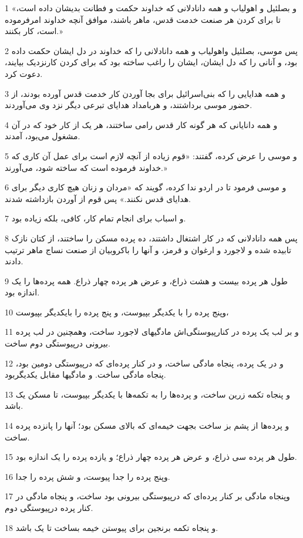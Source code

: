 \par 1 «و بصلئیل و اهولیاب و همه دانادلانی که خداوند حکمت و فطانت بدیشان داده است، تا برای کردن هر صنعت خدمت قدس، ماهر باشند، موافق آنچه خداوند امرفرموده است، کار بکنند.»
\par 2 پس موسی، بصلئیل واهولیاب و همه دانادلانی را که خداوند در دل ایشان حکمت داده بود، و آنانی را که دل ایشان، ایشان را راغب ساخته بود که برای کردن کارنزدیک بیایند، دعوت کرد.
\par 3 و همه هدایایی را که بنی‌اسرائیل برای بجا آوردن کار خدمت قدس آورده بودند، از حضور موسی برداشتند، و هربامداد هدایای تبرعی دیگر نزد وی می‌آوردند.
\par 4 و همه دانایانی که هر گونه کار قدس رامی ساختند، هر یک از کار خود که در آن مشغول می‌بود، آمدند.
\par 5 و موسی را عرض کرده، گفتند: «قوم زیاده از آنچه لازم است برای عمل آن کاری که خداوند فرموده است که ساخته شود، می‌آورند.»
\par 6 و موسی فرمود تا در اردو ندا کرده، گویند که «مردان و زنان هیچ کاری دیگر برای هدایای قدس نکنند.» پس قوم از آوردن بازداشته شدند.
\par 7 و اسباب برای انجام تمام کار، کافی، بلکه زیاده بود.
\par 8 پس همه دانادلانی که در کار اشتغال داشتند، ده پرده مسکن را ساختند، از کتان نازک تابیده شده و لاجورد و ارغوان و قرمز، و آنها را باکروبیان از صنعت نساج ماهر ترتیب دادند.
\par 9 طول هر پرده بیست و هشت ذراع، و عرض هر پرده چهار ذراع. همه پرده‌ها را یک اندازه بود. 
\par 10 وپنج پرده را با یکدیگر بپیوست، و پنج پرده را بایکدیگر بپیوست،
\par 11 و بر لب یک پرده در کنارپیوستگی‌اش مادگیهای لاجورد ساخت، وهمچنین در لب پرده بیرونی در‌پیوستگی دوم ساخت.
\par 12 و در یک پرده، پنجاه مادگی ساخت، و در کنار پرده‌ای که در‌پیوستگی دومین بود، پنجاه مادگی ساخت. و مادگیها مقابل یکدیگربود.
\par 13 و پنجاه تکمه زرین ساخت، و پرده‌ها را به تکمه‌ها با یکدیگر بپیوست، تا مسکن یک باشد.
\par 14 و پرده‌ها از پشم بز ساخت بجهت خیمه‌ای که بالای مسکن بود؛ آنها را پانزده پرده ساخت.
\par 15 طول هر پرده سی ذراع، و عرض هر پرده چهار ذراع؛ و یازده پرده را یک اندازه بود.
\par 16 وپنج پرده را جدا پیوست، و شش پرده را جدا.
\par 17 وپنجاه مادگی بر کنار پرده‌ای که در‌پیوستگی بیرونی بود ساخت، و پنجاه مادگی در کنار پرده در‌پیوستگی دوم.
\par 18 و پنجاه تکمه برنجین برای پیوستن خیمه بساخت تا یک باشد.
